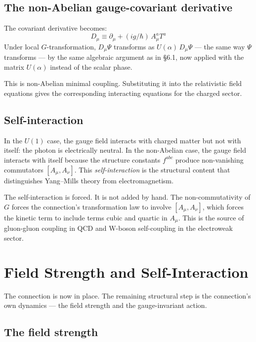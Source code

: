 \documentclass[11pt,a4paper]{article}
\begin{document}
\subsection{The non-Abelian gauge-covariant derivative}

The covariant derivative becomes:
\[
D_\mu \equiv \partial_\mu + (ig/\hbar)\, A_\mu^a T^a
\]
Under local $G$-transformation, $D_\mu \Psi$ transforms as $U(\alpha)\, D_\mu \Psi$ --- the same way $\Psi$ transforms --- by the same algebraic argument as in \S6.1, now applied with the matrix $U(\alpha)$ instead of the scalar phase.

This is non-Abelian minimal coupling. Substituting it into the relativistic field equations gives the corresponding interacting equations for the charged sector.

\subsection{Self-interaction}

In the $U(1)$ case, the gauge field interacts with charged matter but not with itself: the photon is electrically neutral. In the non-Abelian case, the gauge field interacts with itself because the structure constants $f^{abc}$ produce non-vanishing commutators $[A_\mu, A_\nu]$. This \emph{self-interaction} is the structural content that distinguishes Yang--Mills theory from electromagnetism.

The self-interaction is forced. It is not added by hand. The non-commutativity of $G$ forces the connection's transformation law to involve $[A_\mu, A_\nu]$, which forces the kinetic term to include terms cubic and quartic in $A_\mu$. This is the source of gluon-gluon coupling in QCD and W-boson self-coupling in the electroweak sector.

\section{Field Strength and Self-Interaction}

The connection is now in place. The remaining structural step is the connection's own dynamics --- the field strength and the gauge-invariant action.

\subsection{The field strength}
\end{document}
